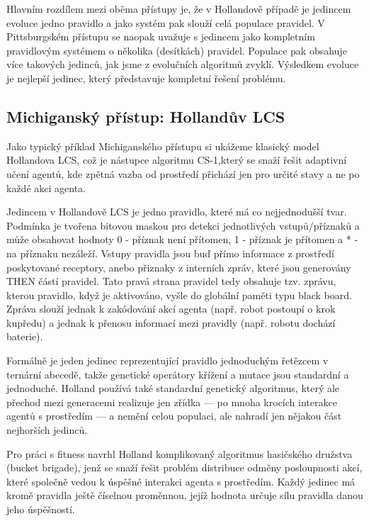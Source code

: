 Hlavním rozdílem mezi oběma přístupy je, že v Hollandově případě je jedincem evoluce jedno pravidlo a jako systém pak slouží celá populace pravidel. V Pittsburgském přístupu se naopak uvažuje s jedincem jako kompletním pravidlovým systémem o několika (desítkách) pravidel. Populace pak obsahuje více takových jedinců, jak jsme z evolučních algoritmů zvyklí.  Výsledkem evoluce je nejlepší jedinec, který představuje kompletní řešení problému. 

\subsection{Michiganský přístup: Hollandův LCS}

Jako typický příklad Michiganského přístupu si ukážeme klasický model Hollandova LCS, což je nástupce algoritmu CS-1,který se snaží řešit adaptivní učení agentů, kde zpětná vazba od prostředí přichází jen pro určité stavy a ne po každé akci agenta. 

Jedincem v Hollandově LCS je jedno pravidlo, které má co nejjednodušší tvar. Podmínka je tvořena bitovou maskou pro detekci jednotlivých vstupů/příznaků a může obsahovat hodnoty 0 - příznak není přítomen, 1 - příznak je přítomen a * - na příznaku nezáleží. Vstupy pravidla jsou buď přímo informace z prostředí poskytované receptory, anebo přiznaky z interních zpráv, které jsou generovány THEN částí pravidel. Tato pravá strana pravidel tedy obsahuje tzv. zprávu, kterou pravidlo, když je aktivováno, vyšle do globální paměti typu black board. Zpráva slouží jednak k zakódování akcí agenta (např. robot postoupí o krok kupředu) a jednak k přenosu informací mezi pravidly (např. robotu dochází baterie). 

Formálně je jeden jedinec reprezentující pravidlo jednoduchým řetězcem v ternární abecedě, takže genetické operátory křížení a mutace jsou standardní a jednoduché. Holland používá také standardní genetický algoritmus, který ale přechod mezi generacemi realizuje jen zřídka --- po mnoha krocích interakce agentů s prostředím --- a nemění celou populaci, ale nahradí jen nějakou část nejhorších jedinců. 

Pro práci s fitness navrhl Holland komplikovaný algoritmus hasičského družstva (bucket brigade), jenž se snaží řešit problém distribuce odměny posloupnosti akcí, které společně vedou k úspěšné interakci agenta s prostředím. Každý jedinec má kromě pravidla ještě číselnou proměnnou, jejíž hodnota určuje sílu pravidla danou jeho úspěšností.   

